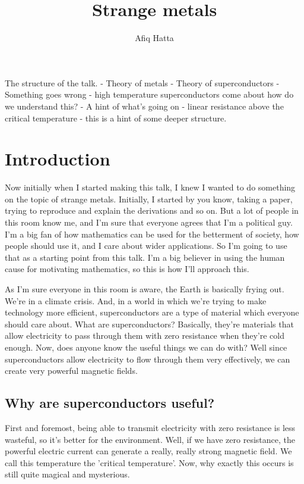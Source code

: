 \documentclass[11pt, oneside]{article}   	%
\title{Strange metals}
\author{Afiq Hatta}
\theoremstyle{slanted}
\begin{document}
 
\maketitle

The structure of the talk. 
- Theory of metals 
- Theory of superconductors 
- Something goes wrong - high temperature superconductors come about how do we understand this? 
- A hint of what's going on - linear resistance above the critical temperature - this is a hint of 
some deeper structure. 


\section{Introduction}
Now initially when I started making this talk, I knew I wanted to do something
on the topic of strange metals. Initially, I started by you know, taking a paper, 
trying to reproduce and explain the derivations and so on. But a lot of people in this room know me, 
and I'm sure that everyone agrees that I'm a political guy. 
I'm a big fan of how mathematics 
can be used for the betterment of society, how people should use it, 
and I care about wider applications. So I'm going to use that as a starting point from this talk.
I'm a big believer in using the human cause for motivating mathematics, 
so this is how I'll approach this. 

As I'm sure everyone in this room is aware, the Earth is basically frying out. 
We're in a climate crisis. 
And, in a world in which we're trying to make technology more efficient, 
superconductors are a type of material which everyone should care about. 
What are superconductors? Basically, they're materials that allow electricity to pass through 
them with zero resistance when they're cold enough. 
Now, does anyone know the useful things we can do with?
Well since superconductors allow electricity to flow 
through them very effectively, we can 
create very powerful magnetic fields. 

\subsection{Why are superconductors useful?} 
First and foremost, being able to 
transmit electricity with zero resistance is less 
wasteful, so it's better for the environment. 
Well, if we have zero resistance, the powerful electric current 
can generate a really, really strong magnetic field. 
We call this temperature the 
'critical temperature'. Now, why exactly this occurs is still quite magical 
and mysterious. 
\end{document}
